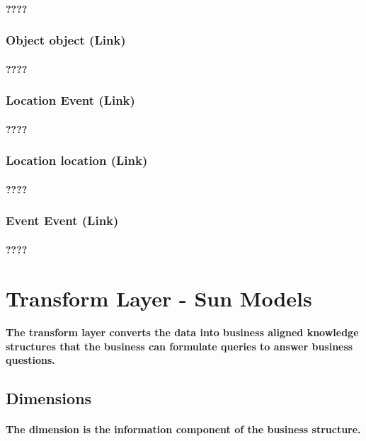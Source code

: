 \paragraph{????}
\subsubsection{Object object (Link)}
\paragraph{????}
\subsubsection{Location Event (Link)}
\paragraph{????}
\subsubsection{Location location (Link)}
\paragraph{????}
\subsubsection{Event Event (Link)}
\paragraph{????}
\pagebreak
\section{Transform Layer - Sun Models}
\paragraph{The transform layer converts the data into business aligned knowledge structures that the business can formulate queries to answer business questions.}
\subsection{Dimensions}
\paragraph{The dimension is the information component of the business structure.}
